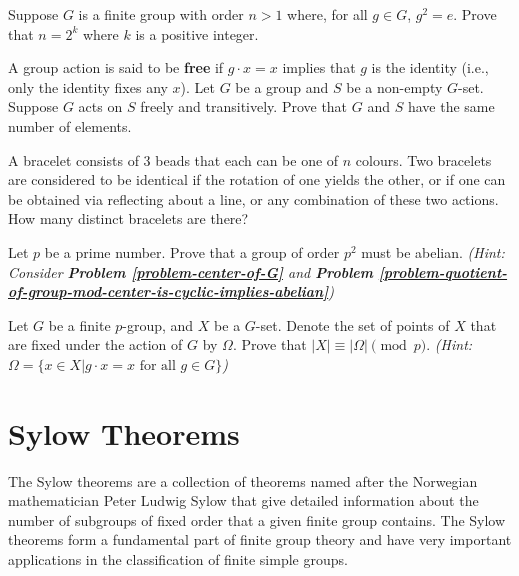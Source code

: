 \begin{problem}
    Suppose $G$ is a finite group with order $n > 1$ where, for all $g \in G$, $g^2 = e$. Prove that $n = 2^k$ where $k$ is a positive integer.
\end{problem}

\begin{problem}
    A group action is said to be \textbf{free} if $g\cdot x = x$ implies that $g$ is the identity (i.e., only the identity fixes any $x$).\newline
    Let $G$ be a group and $S$ be a non-empty $G$-set. Suppose $G$ acts on $S$ freely and transitively. Prove that $G$ and $S$ have the same number of elements.
\end{problem}

\begin{problem}
    A bracelet consists of 3 beads that each can be one of $n$ colours. Two bracelets are considered to be identical if the rotation of one yields the other, or if one can be obtained via reflecting about a line, or any combination of these two actions. How many distinct bracelets are there?
\end{problem}

\begin{problem}\label{problem-group-of-order-prime-squared-is-abelian}
    Let $p$ be a prime number. Prove that a group of order $p^2$ must be abelian.\newline
    \textit{(Hint: Consider \textbf{Problem \ref{problem-center-of-G}} and \textbf{Problem \ref{problem-quotient-of-group-mod-center-is-cyclic-implies-abelian}})}
\end{problem}

\begin{problem}
    Let $G$ be a finite $p$-group, and $X$ be a $G$-set. Denote the set of points of $X$ that are fixed under the action of $G$ by $\Omega$. Prove that $|X| \equiv |\Omega| \pmod p$.\newline
    \textit{(Hint: $\Omega = \{x \in X \vert g\cdot x = x \textrm{ for all } g \in G\}$)}
\end{problem}

\chapter{Sylow Theorems}
The Sylow theorems are a collection of theorems named after the Norwegian mathematician Peter Ludwig Sylow that give detailed information about the number of subgroups of fixed order that a given finite group contains. The Sylow theorems form a fundamental part of finite group theory and have very important applications in the classification of finite simple groups.

